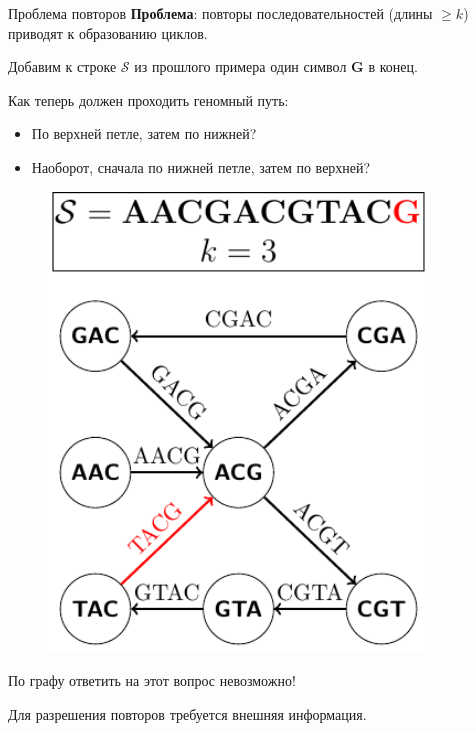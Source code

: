 \documentclass[unicode, notheorems]{beamer}
\begin{document}
\begin{frame}{Проблема повторов}
	\textbf{Проблема}: повторы последовательностей (длины $\ge k$) приводят к образованию циклов.
\begin{minipage}{0.6\textwidth}
	
	\bigskip
	Добавим к строке $\mathcal{S}$ из прошлого примера один символ \textbf{\color{red} G} в конец.
	
	\medskip
	Как теперь должен проходить геномный путь: \begin{itemize}
		\item По верхней петле, затем по нижней?
		\item Наоборот, сначала по нижней петле, затем по верхней?
	\end{itemize}
\end{minipage}%
\begin{minipage}{0.4\textwidth}
	\begin{figure}
		\centering
		\includegraphics[width=0.9\textwidth]{fig/dBg_repeat}
	\end{figure}
\end{minipage}

\bigskip
По графу ответить на этот вопрос невозможно!

\medskip
{\color{blue} Для разрешения повторов требуется внешняя информация.}
\end{frame}
\end{document}
